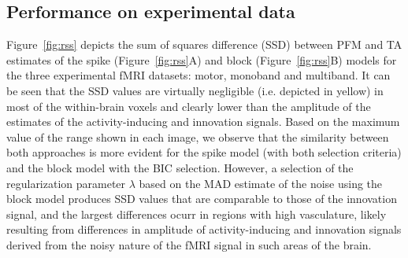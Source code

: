 
\subsection{Performance on experimental data}

Figure~\ref{fig:rss} depicts the sum of squares difference (SSD) between PFM and TA estimates of the spike (Figure~\ref{fig:rss}A) and block (Figure~\ref{fig:rss}B) models for the three experimental fMRI datasets: motor, monoband and multiband. It can be seen that the SSD values are virtually negligible (i.e. depicted in yellow) in most of the within-brain voxels and clearly lower than the amplitude of the estimates of the activity-inducing and innovation signals. Based on the maximum value of the range shown in each image, we observe that the similarity between both approaches is more evident for the spike model (with both selection criteria) and the block model with the BIC selection. However, a selection of the regularization parameter $\lambda$ based on the MAD estimate of the noise using the block model produces SSD values that are comparable to those of the innovation signal, and the largest differences ocurr in regions with high vasculature, likely resulting from differences in amplitude of activity-inducing and innovation signals derived from the noisy nature of the fMRI signal in such areas of the brain. 

